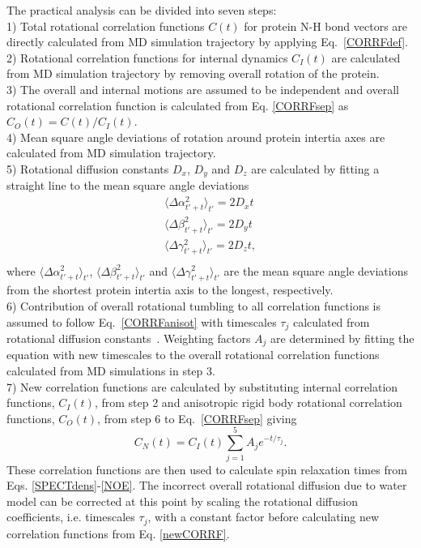 \documentclass[pre,aps,floatfix,authordate1-4,twocolumn]{revtex4-1}
\begin{document}
The practical analysis can be divided into seven steps: \\
1) Total rotational correlation functions $C(t)$
for protein N-H bond vectors are directly calculated from MD simulation trajectory
by applying Eq.~\ref{CORRFdef}. \\
2) Rotational correlation functions for internal
dynamics $C_I(t)$ are calculated from MD simulation trajectory
by removing overall rotation of the protein. \\
3) The overall and internal motions are assumed to be independent and overall
rotational correlation function is calculated from Eq. \ref{CORRFsep} as $C_O(t)=C(t)/C_I(t)$. \\
4) Mean square angle deviations of rotation around protein intertia axes
are calculated from MD simulation trajectory. \\
5) Rotational diffusion constants $D_x$, $D_y$ and $D_z$ are calculated by fitting a straight line
to the mean square angle deviations 
\begin{equation}\label{DIFFdef}
  \begin{aligned}
    \langle \Delta \alpha_{t'+t}^2 \rangle_{t'} = 2 D_{x} t \\
    \langle \Delta \beta_{t'+t}^2 \rangle_{t'} = 2 D_{y} t \\
    \langle \Delta \gamma_{t'+t}^2 \rangle_{t'} = 2 D_{z} t, \\
  \end{aligned}
\end{equation}
where $\langle \Delta \alpha_{t'+t}^2 \rangle_{t'}$,
$\langle \Delta \beta_{t'+t}^2 \rangle_{t'}$ and
$\langle \Delta \gamma_{t'+t}^2 \rangle_{t'}$ are
the mean square angle deviations from the shortest protein
intertia axis to the longest, respectively.\\
6) Contribution of overall rotational tumbling to all correlation
functions is assumed to follow Eq.~\ref{CORRFanisot} with
timescales $\tau_j$ calculated from rotational diffusion constants~\cite{Note1}.
Weighting factors $A_j$ are determined by fitting the equation with new timescales
to the overall rotational correlation functions calculated from MD simulations in step 3. \\
7) New correlation functions are calculated by substituting
internal correlation functions, $C_I(t)$, from step 2 and anisotropic rigid body
rotational correlation functions, $C_O(t)$, from step 6 to
Eq.~\ref{CORRFsep} giving
\begin{equation}\label{newCORRF}
  C_N(t)=C_I(t)\sum_{j=1}^5 A_j e^{-t/\tau_j}.
\end{equation}
These correlation functions are then used to calculate spin relaxation times
from Eqs. \ref{SPECTdens}-\ref{NOE}. The incorrect overall rotational
diffusion due to water model can be corrected at this point  by scaling the rotational diffusion
coefficients, i.e. timescales $\tau_j$, with a constant factor before calculating
new correlation functions from Eq. \ref{newCORRF}.
\end{document}

